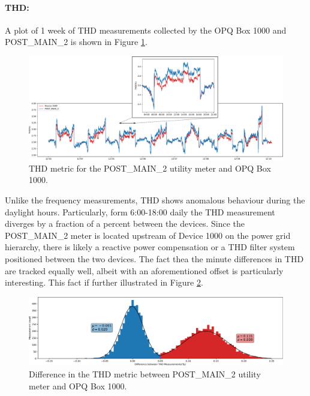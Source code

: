 \paragraph{THD:}
A plot of 1 week of THD measurements collected by the OPQ Box 1000 and POST\_MAIN\_2 is shown in Figure \ref{expdes:fig:postmain2:thd}.

\begin{figure}[ht!]
    \centering
    \includegraphics[width=1\linewidth]{img/napali_eval/gt/gt_thd.pdf}
    \caption{THD metric for the POST\_MAIN\_2 utility meter and OPQ Box 1000.}
    \label{expdes:fig:postmain2:thd}
\end{figure}

Unlike the frequency measurements, THD shows anomalous behaviour during the daylight hours.
Particularly, form 6:00-18:00 daily the THD measurement diverges by a fraction of a percent between the devices.
Since the POST\_MAIN\_2 meter is located upstream of Device 1000 on the power grid hierarchy, there is likely a reactive power compensation or a THD filter system positioned between the two devices.
The fact thea the minute differences in THD are tracked equally well, albeit with an aforementioned offset is particularly interesting.
This fact if further illustrated in Figure \ref{expdes:fig:postmain2:thd_diff}.

\begin{figure}[ht!]
    \centering
    \includegraphics[width=1\linewidth]{img/napali_eval/gt/gt_thd_diff.pdf}
    \caption{Difference in the THD metric between POST\_MAIN\_2 utility meter and OPQ Box 1000.}
    \label{expdes:fig:postmain2:thd_diff}
\end{figure}

